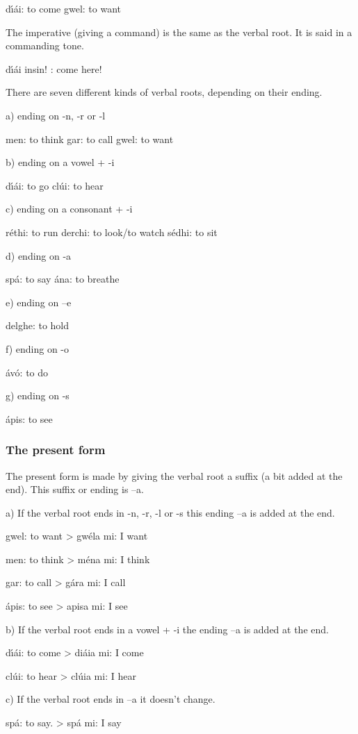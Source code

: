 d\'{\i}\'{a}i: to come
gwel: to want

The imperative (giving a command) is the same as the verbal root. It is said in a commanding tone.

d\'{\i}\'{a}i insin! : come here!

There are seven different kinds of verbal roots, depending on their ending.

a) ending on -n, -r or -l

men: to think
gar: to call
gwel: to want

b) ending on a vowel + -i

d\'{\i}\'{a}i: to go
cl\'{u}i: to hear

c) ending on a consonant + -i

r\'{e}thi: to run
derchi: to look/to watch
s\'{e}dhi: to sit

d) ending on -a

sp\'{a}: to say
\'{a}na: to breathe

e) ending on –e

delghe: to hold

f) ending on -o

\'{a}v\'{o}: to do

g) ending on -s

\'{a}pis: to see


\subsubsection{The present form}

The present form is made by giving the verbal root a suffix (a bit added at the end). This suffix or ending is –a. 

a) If the verbal root ends in -n, -r, -l or -s this ending –a is added at the end.

gwel: to want
> gw\'{e}la mi: I want

men: to think
> m\'{e}na mi: I think

gar: to call
> g\'{a}ra mi: I call

\'{a}pis: to see
> apisa mi: I see

b) If the verbal root ends in a vowel + -i the ending –a is added at the end.

d\'{\i}\'{a}i: to come
> di\'{a}ia mi: I come

cl\'{u}i: to hear
> cl\'{u}ia mi: I hear

c) If the verbal root ends in –a it doesn’t change.

sp\'{a}: to say.
> sp\'{a} mi: I say

